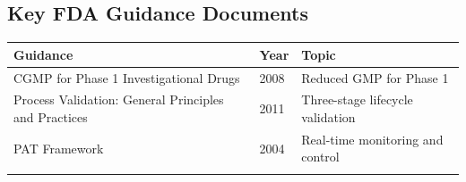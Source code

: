 \documentclass[
  11pt,
  a4paper,
]{report}
\begin{document}
\hypertarget{key-fda-guidance-documents}{%
\subsection{Key FDA Guidance
Documents}\label{key-fda-guidance-documents}}

\begin{longtable}[]{@{}lll@{}}
\toprule
\begin{minipage}[b]{0.40\columnwidth}\raggedright
Guidance\strut
\end{minipage} & \begin{minipage}[b]{0.24\columnwidth}\raggedright
Year\strut
\end{minipage} & \begin{minipage}[b]{0.28\columnwidth}\raggedright
Topic\strut
\end{minipage}\tabularnewline
\midrule
\endhead
\begin{minipage}[t]{0.40\columnwidth}\raggedright
CGMP for Phase 1 Investigational Drugs\strut
\end{minipage} & \begin{minipage}[t]{0.24\columnwidth}\raggedright
2008\strut
\end{minipage} & \begin{minipage}[t]{0.28\columnwidth}\raggedright
Reduced GMP for Phase 1\strut
\end{minipage}\tabularnewline
\begin{minipage}[t]{0.40\columnwidth}\raggedright
Process Validation: General Principles and Practices\strut
\end{minipage} & \begin{minipage}[t]{0.24\columnwidth}\raggedright
2011\strut
\end{minipage} & \begin{minipage}[t]{0.28\columnwidth}\raggedright
Three-stage lifecycle validation\strut
\end{minipage}\tabularnewline
\begin{minipage}[t]{0.40\columnwidth}\raggedright
PAT Framework\strut
\end{minipage} & \begin{minipage}[t]{0.24\columnwidth}\raggedright
2004\strut
\end{minipage} & \begin{minipage}[t]{0.28\columnwidth}\raggedright
Real-time monitoring and control\strut
\end{minipage}\tabularnewline
\begin{minipage}[t]{0.40\columnwidth}\raggedright

\end{minipage}
\end{longtable}
\end{document}

